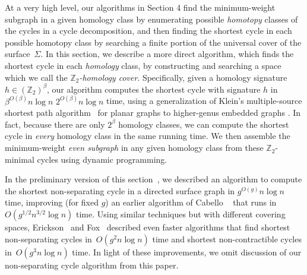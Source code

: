 \documentclass[letterpaper,review]{siamart190516}
\def\Z{\mathbb{Z}}
\def\modified#1{\color{blue}#1 \color{black}}
\begin{document}
At a very high level, our algorithms in Section 4 find the minimum-weight subgraph in a given homology class by enumerating possible \emph{homotopy} classes of the cycles in a cycle decomposition, and then finding the shortest cycle in each possible homotopy class by searching a finite portion of the universal cover of the surface~$\Sigma$.  In this section, we describe a more direct algorithm, which finds the shortest cycle in each \emph{homology} class, by constructing and searching a space which we call the \emph{$\Z_2$-homology cover}.
Specifically, given a homology signature $h\in (\Z_2)^\beta$, our algorithm computes the shortest
cycle with signature $h$ in \sout{$\beta^{O(\beta)} n \log n$} \modified{$2^{O(\beta)} n \log n$} time, using a generalization of Klein's
multiple-source shortest path algorithm~\cite{k-msspp-05} for planar graphs to higher-genus embedded
graphs \cite{cce-msspe-13,efl-hmcpf-18}.
In fact, because there are only $2^\beta$ homology classes, we can compute the shortest cycle in \emph{every} homology class in the same running time.
We then assemble the minimum-weight \emph{even subgraph} in any given homology class from these $\Z_2$-minimal cycles using dynamic programming.

In the preliminary version of this section~\cite{en-mcsnc-11}, we described an algorithm to compute
the shortest non-separating cycle in a directed surface graph in $g^{O(g)} n \log n$ time, improving
(for fixed $g$) an earlier algorithm of Cabello \etal~\cite{ccl-fsncd-10} that runs in
$O(g^{1/2}n^{3/2}\log n)$ time.  Using similar techniques but with different covering spaces,
Erickson~\cite{e-sncds-11} and Fox~\cite{f-sntcd-13} described even faster algorithms that find
shortest non-separating cycles in~$O(g^2 n \log n)$ time and shortest non-contractible cycles
in~$O(g^3 n \log n)$ time.  In light of these improvements, we omit discussion of our non-separating
cycle algorithm from this paper.

%
%
%
%
%
%
%
%
\end{document}
